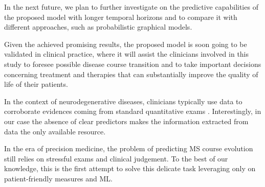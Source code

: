 In the next future, we plan to further investigate on the predictive capabilities of the proposed model with longer temporal horizons and to compare it with different approaches, such as probabilistic graphical models.

Given the achieved promising results, the proposed model is soon going to be validated in clinical practice, where it will assist the clinicians involved in this study to foresee possible disease course transition and to take important decisions concerning treatment and therapies that can substantially improve the quality of life of their patients.

In the context of neurodegenerative diseases, clinicians typically use \PCOs data to corroborate evidences coming from standard quantitative exams \cite{black2013patient}. Interestingly, in our case the absence of clear \SP predictors makes the information extracted from \PCOs data the only available resource.

In the era of precision medicine, the problem of predicting MS course evolution still relies on stressful exams and clinical judgement.
To the best of our knowledge, this is the first attempt to solve this delicate task leveraging only on patient-friendly measures and ML.


